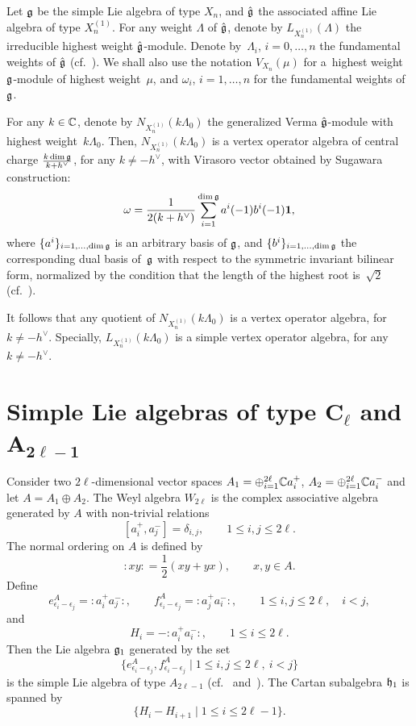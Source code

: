 \documentclass[11pt]{article}
\newcommand{\C}{\Bbb C}
\newcommand{\1}{\bf 1}
\begin{document}
Let $\frak g$ be the simple Lie algebra of type $X_{n}$, and
$\hat{\frak g}$ the associated af\/f\/ine Lie algebra of type
$X_{n}^{(1)}$. For any weight $\Lambda$ of $\hat{\frak g}$, denote
by $L_{X_{n} ^{(1)}}(\Lambda)$ the irreducible highest weight
$\hat{\frak g}$-module. Denote by~$\Lambda _i$, $i=0, \ldots, n$ the
fundamental weights of $\hat{\frak g}$ (cf.~\cite{K1}). We shall
also use the notation $V_{X_n}(\mu)$ for a~highest weight $\frak
g$-module of highest weight~$\mu$, and $\omega _i$, $i=1, \ldots, n$
for the fundamental weights of~$\frak g$.


{\sloppy For any $k \in \C$, denote by $N_{X_{n} ^{(1)}}(k \Lambda _0)$ the
generalized Verma $\hat{\frak g}$-module with highest weight~$k
\Lambda _0$. Then, $N_{X_{n} ^{(1)}}(k \Lambda _0)$ is a vertex
operator algebra of central charge $\frac{k \dim \frak
g}{k+h^{\vee}}$, for any $k \neq - h^{\vee}$, with Virasoro vector
obtained by Sugawara construction:
\begin{gather} \label{Vir-Sugawara}
\omega=\frac{1}{2(k+h^{\vee})}\sum_{i=1}^{\dim {\frak g}}
a^{i}(-1)b^{i}(-1){\bf 1},
\end{gather}
where $\{a^{i}\}_{i=1, \dots, \dim {\frak g}}$ is an arbitrary basis
of ${\frak g}$, and $\{b^{i}\}_{i=1, \dots, \dim {\frak g}}$  the
corresponding dual basis of~${\frak g}$ with respect to the
symmetric invariant bilinear form, normalized by the condition that
the length of the highest root is~$\sqrt{2}$ (cf.~\cite{FrB,FZ,K,LL,L}).

}

It follows that any quotient of $N_{X_{n} ^{(1)}}(k \Lambda _0)$ is
a vertex operator algebra, for $k \neq - h^{\vee}$. Specially,
$L_{X_{n} ^{(1)}}(k \Lambda _0)$ is a simple vertex operator
algebra, for any $k \neq - h^{\vee}$.



\section[Simple Lie algebras of type $C_{\ell}$ and $A_{2\ell -1}$]{Simple Lie algebras of type $\boldsymbol{C_{\ell}}$ and $\boldsymbol{A_{2\ell -1}}$}

Consider two $2 \ell$-dimensional vector spaces $A_1 = \oplus
_{i=1} ^{2 \ell}{\C} a_i ^+$, $ A_2 = \oplus _{i=1}^ {2 \ell} {\C}
a_i^-$ and let $A=A_1 {\oplus} A_2$. The Weyl algebra $W_{2 \ell}$ is
the complex associative algebra generated by $A$ with non-trivial
relations
\[
[a_i ^+,a_j^-]=\delta_{i,j} , \qquad 1 \le i,j \le 2 \ell.
\]
%
The normal ordering on $A$ is def\/ined by
\[
:\!xy\!:    = \frac 1 2 (xy+yx),  \qquad x,y \in A .
\]
Def\/ine
\[
e_{\epsilon_i-\epsilon_j}^A=  :\!a_i ^+ a_j^-\!:, \qquad
f_{\epsilon_i-\epsilon_j}^A=  :\!a_j ^+ a_i^-\!:, \qquad 1 \le i,j
\le 2 \ell, \quad i<j,
\]
and
\[
H_i=-:\!a_i ^+ a_i^-\!:,  \qquad 1 \le i \le 2 \ell.
\]
Then the Lie algebra $\frak g _1$ generated by the set
\[
\big\{ e_{\epsilon_i-\epsilon_j}^A, f_{\epsilon_i-\epsilon_j}^A \; \vert
\; 1 \le i,j \le 2 \ell, \ i < j \big\}
\]
is the simple Lie algebra of type $A_{2 \ell -1}$ (cf.~\cite{Bou}
and~\cite{FF}). The Cartan subalgebra $\frak h _1$ is spanned by
\[
\{ H_i - H_{i+1}  \; \vert \; 1 \le i \le 2 \ell -1 \}.
\]
\end{document}
